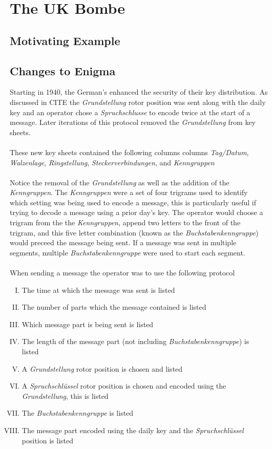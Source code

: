 

\chapter{The UK Bombe}

\section{Motivating Example}

\section{Changes to Enigma}

Starting in 1940, the German's enhanced the security of their
key distribution. As discussed in CITE the \emph{Grundstellung} rotor
position was sent along with the daily key and an operator chose a
\emph{Spruchschlusse} to
encode twice at the start of a message. Later iterations of this
protocol removed the \emph{Grundstellung}
from key sheets.
\\\\These new key sheets contained the following columns
columns \emph{Tag/Datum}, \emph{Walzenlage}, \emph{Ringstellung},
\emph{Steckerverbindungen}, and \emph{Kenngruppen}
\\\\Notice the removal of the \emph{Grundstellung} as well as the
addition of the \emph{Kenngruppen}. The \emph{Kenngruppen} were a set of
four trigrams used to identify which setting was being used to encode
a message, this is particularly useful if trying to decode a message
using a prior day's key.
The operator would choose a trigram from the the \emph{Kenngruppen},
append two letters to the front of the trigram,
and this five letter combination (known as the
\emph{Buchstabenkenngruppe}) would preceed the message being sent. If a message
was sent in multiple segments, multiple \emph{Buchstabenkenngruppe}
were used to start each segment.
\\\\When sending a message the operator was to use the following protocol
\begin{enumerate}[I.]
  \item The time at which the message was sent is listed
  \item The number of parts which the message contained is listed
  \item Which message part is being sent is listed
  \item The length of the message part (not including
    \emph{Buchstabenkenngruppe}) is listed
  \item A \emph{Grundstellung} rotor position is chosen and listed
  \item A \emph{Spruchschlüssel} rotor position is chosen and encoded
    using the \emph{Grundstellung}, this is listed
  \item The \emph{Buchstabenkenngruppe} is listed
  \item The message part encoded using the daily key and the
    \emph{Spruchschlüssel} position is listed
\end{enumerate}
